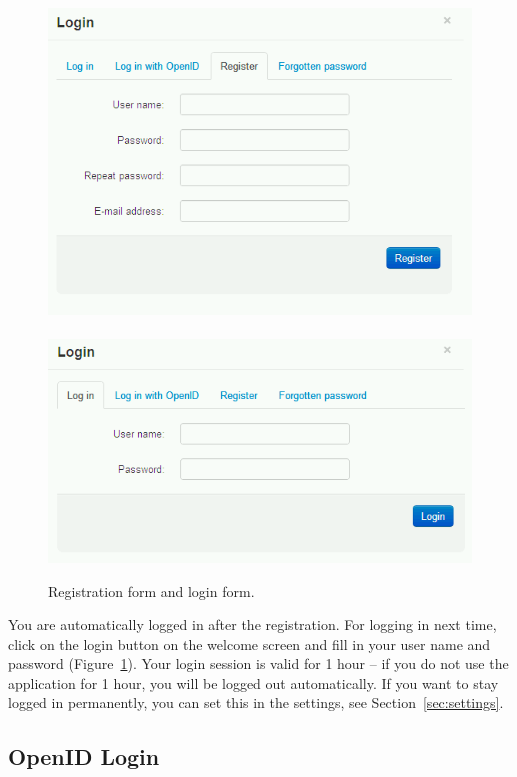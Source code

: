 \begin{figure}[h]
\begin{center}
\includegraphics[scale=0.4]{figures/user_manual/register.png}~~~~\includegraphics[scale=0.4]{figures/user_manual/login.png}
\end{center}
\caption{Registration form and login form.}
\label{fig:register_login}
\end{figure}

You are automatically logged in after the registration. For logging in next time, click on the login button on the welcome screen and fill in your user name and password (Figure~\ref{fig:register_login}). Your login session is valid for 1 hour -- if you do not use the application for 1 hour, you will be logged out automatically. If you want to stay logged in permanently, you can set this in the settings, see Section~\ref{sec:settings}.

\subsection{OpenID Login}

